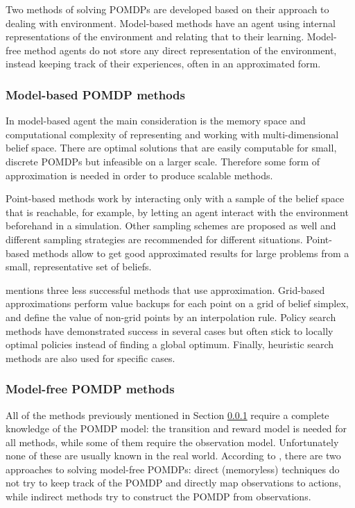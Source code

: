 Two methods of solving POMDPs are developed based on their approach to dealing
with environment. Model-based methods have an agent using internal
representations of the environment and relating that to their learning. Model-
free method agents do not store any direct representation of the environment,
instead keeping track of their experiences, often in an approximated form.

\subsubsection{Model-based POMDP methods}
\label{sec:ai:pomdp:model:based}

In model-based agent the main consideration is the memory space and
computational complexity of representing and working with multi-dimensional
belief space. There are optimal solutions that are easily computable for small,
discrete POMDPs but infeasible on a larger scale. Therefore some form of
approximation is needed in order to produce scalable methods.
\parencite{Spaan2012ai+pomdp}

Point-based methods work by interacting only with a sample of the belief space
that is reachable, for example, by letting an agent interact with the
environment beforehand in a simulation. Other sampling schemes are proposed as
well and different sampling strategies are recommended for different
situations. Point-based methods allow to get good approximated results for
large problems from a small, representative set of beliefs.
\parencite{Spaan2012ai+pomdp}

\textcite{Spaan2012ai+pomdp} mentions three less successful methods that use
approximation. Grid-based approximations perform value backups for each point
on a grid of belief simplex, and define the value of non-grid points by an
interpolation rule. Policy search methods have demonstrated success in several
cases but often stick to locally optimal policies instead of finding a global
optimum. Finally, heuristic search methods are also used for specific cases.


\subsubsection{Model-free POMDP methods}
\label{sec:ai:pomdp:model:free}

All of the methods previously mentioned in Section
\ref{sec:ai:pomdp:model:based} require a complete knowledge of the POMDP model:
the transition and reward model is needed for all methods, while some of them
require the observation model. Unfortunately none of these are usually known in
the real world. According to \textcite{Spaan2012ai+pomdp}, there are two
approaches to solving model-free POMDPs: direct (memoryless) techniques do not
try to keep track of the POMDP and directly map observations to actions, while
indirect methods try to construct the POMDP from observations.

